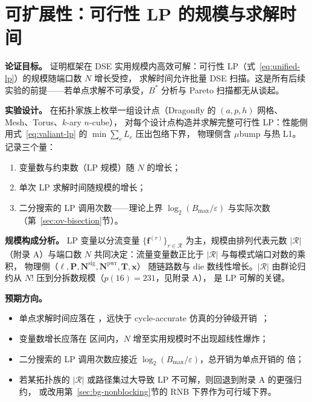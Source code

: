 \section{可扩展性：可行性 LP 的规模与求解时间}\label{sec:scalability}

\textbf{论证目标。}
证明框架在 DSE 实用规模内高效可解：可行性 LP（式~\eqref{eq:unified-lp}）的规模随端口数 $N$ 增长受控，
求解时间允许批量 DSE 扫描。这是所有后续实验的前提——若单点求解不可承受，$B^*$ 分析与 Pareto 扫描都无从谈起。

\textbf{实验设计。}
在拓扑家族上枚举一组设计点（Dragonfly 的 $(a,p,h)$ 网格、Mesh、Torus、$k$-ary $n$-cube），
对每个设计点构造并求解完整可行性 LP：性能侧用式~\eqref{eq:valiant-lp} 的 $\min\sum_e L_e$ 压出包络下界，
物理侧含 $\mu$bump 与热 L1。记录三个量：
\begin{enumerate}
    \item 变量数与约束数（LP 规模）随 $N$ 的增长；
    \item 单次 LP 求解时间随规模的增长；
    \item 二分搜索的 LP 调用次数——理论上界 $\log_2(B_{\max}/\varepsilon)$ 与实际次数（第~\ref{sec:ov-bisection}节）。
\end{enumerate}

\textbf{规模构成分析。}
LP 变量以分流变量 $\{\mathbf{f}^{(r)}\}_{r\in\mathcal{R}}$ 为主，规模由排列代表元数 $|\mathcal{R}|$
（附录 A）与端口数 $N$ 共同决定：流量变量数正比于 $|\mathcal{R}|$ 与每模式端口对数的乘积，
物理侧（$\boldsymbol{\ell},\mathbf{P},\mathbf{N}^{\text{sig}},\mathbf{N}^{\text{pwr}},\mathbf{T},\mathbf{x}$）
随链路数与 die 数线性增长。$|\mathcal{R}|$ 由群论归约从 $N!$ 压到分拆数规模（$p(16)=231$，见附录 A），
是 LP 可解的关键。

\textbf{预期方向。}
\begin{itemize}
    \item 单点求解时间应落在 ，远快于 cycle-accurate 仿真的分钟级开销~\cite{dally2004principles}；
    \item 变量数增长应落在  区间内，$N$ 增至实用规模时不出现超线性爆炸；
    \item 二分搜索的 LP 调用次数应接近 $\log_2(B_{\max}/\varepsilon)$，总开销为单点开销的  倍；
    \item 若某拓扑族的 $|\mathcal{R}|$ 或路径集过大导致 LP 不可解，则回退到附录 A 的更强归约，
    或改用第~\ref{sec:bg-nonblocking}节的 RNB 下界作为可行域下界。
\end{itemize}
